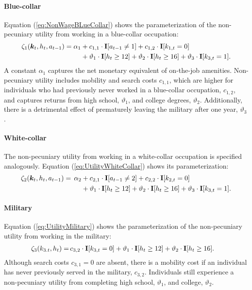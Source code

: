 \paragraph{Blue-collar}
Equation (\ref{eq:NonWageBLueCollar}) shows the parameterization of the non-pecuniary utility from working in a blue-collar occupation:
%
\begin{align}\label{eq:NonWageBLueCollar}
\zeta_{1}(\bm{k}_t, h_t, a_{t-1})  = \alpha_1  &+ c_{1,1} \cdot {\textbf{I}}[a_{t-1} \neq 1] + c_{1,2} \cdot {\textbf{I}}[k_{1,t} = 0] \\ \nonumber
                            & + \vartheta_1 \cdot {\textbf{I}}[h_t \geq 12] + \vartheta_2 \cdot {\textbf{I}}[h_t \geq 16] + \vartheta_3 \cdot {\textbf{I}}[k_{3,t} = 1].
\end{align}
%
A constant $\alpha_1$ captures the net monetary equivalent of on-the-job amenities. Non-pecuniary utility includes mobility and search costs $c_{1,1}$, which are higher for individuals who had previously never worked in a blue-collar occupation, $c_{1,2}$, and captures returns from high school, $\vartheta_1$, and college degrees, $\vartheta_2$. Additionally, there is a detrimental effect of prematurely leaving the military after one year, $\vartheta_3$.
\paragraph{White-collar}
The non-pecuniary utility from working in a white-collar occupation is specified analogously. Equation (\ref{eq:UtilityWhiteCollar}) shows its parameterization:
%
\begin{align}\label{eq:UtilityWhiteCollar}
\zeta_{2}( \bm{k}_t, h_t, a_{t-1} ) = \,\alpha_2 & + c_{2,1} \cdot {\textbf{I}}[a_{t-1} \neq 2] + c_{2,2} \cdot {\textbf{I}}[k_{2,t} = 0]\\\nonumber
                            & + \vartheta_1 \cdot {\textbf{I}}[h_t \geq 12] + \vartheta_2 \cdot {\textbf{I}}[h_t \geq 16] + \vartheta_3 \cdot {\textbf{I}}[k_{3,t} = 1].
\end{align}
\paragraph{Military}
Equation (\ref{eq:UtilityMilitary}) shows the parameterization of the non-pecuniary utility from working in the military:
%
\begin{align}\label{eq:UtilityMilitary}
\zeta_{3}( k_{3.t}, h_t)  = \,& c_{3,2} \cdot {\textbf{I}}[k_{3,t} = 0]+ \vartheta_1 \cdot {\textbf{I}}[h_t \geq 12] + \vartheta_2 \cdot {\textbf{I}}[h_t \geq 16].
\end{align}
%
Although search costs $c_{3, 1} = 0$ are absent, there is a mobility cost if an individual has never previously served in the military, $c_{3,2}$. Individuals still experience a non-pecuniary utility from completing high school, $\vartheta_1$, and college, $\vartheta_2$.
